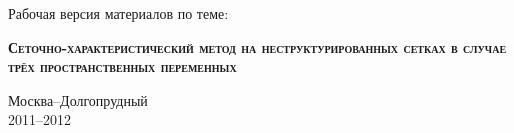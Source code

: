 \begin{titlepage}
\newpage

\listoftodos

\begin{center}
\end{center}

\vspace{2em}

\begin{center}
Рабочая версия материалов по теме:
\end{center}

\vspace{5em}

\begin{center}
\textsc{\textbf{Сеточно-характеристический метод на неструктурированных сетках в случае трёх пространственных переменных}}
\end{center}

\vspace{\fill}
\begin{center}
Москва--Долгопрудный\\
2011--2012
\end{center}

\end{titlepage}
